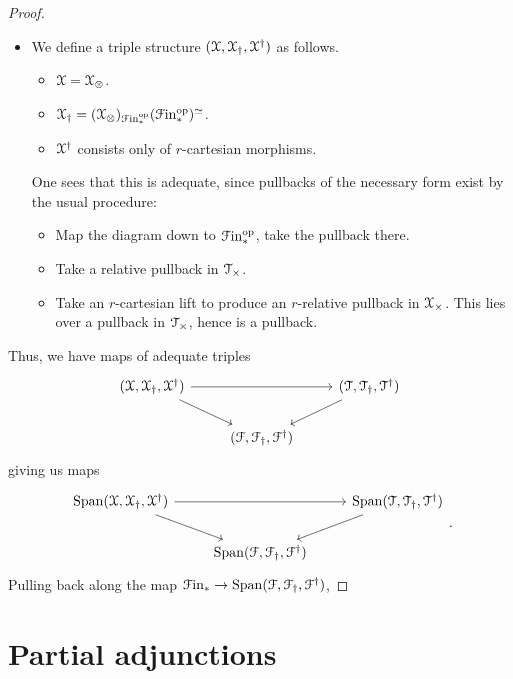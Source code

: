 \documentclass[main.tex]{subfiles}
\begin{document}
\begin{proof}
\begin{itemize}
    \item We define a triple structure $(\mathcal{X}, \mathcal{X}_{\dagger}, \mathcal{X}^{\dagger})$ as follows.
      \begin{itemize}
        \item $\mathcal{X} = \mathcal{X}_{\otimes}$.

        \item $\mathcal{X}_{\dagger} = (\mathcal{X}_{\otimes})_{\mathcal{F}\mathrm{in}_{*}^{\mathrm{op}}}(\mathcal{F}\mathrm{in}_{*}^{\mathrm{op}})^{\simeq}$.

        \item $\mathcal{X}^{\dagger}$ consists only of $r$-cartesian morphisms.
      \end{itemize}

      One sees that this is adequate, since pullbacks of the necessary form exist by the usual procedure:
      \begin{itemize}
        \item Map the diagram down to $\mathcal{F}\mathrm{in}_{*}^{\mathrm{op}}$, take the pullback there.

        \item Take a relative pullback in $\mathcal{T}_{\times}$.

        \item Take an $r$-cartesian lift to produce an $r$-relative pullback in $\mathcal{X}_{\times}$. This lies over a pullback in $\mathcal{T}_{\times}$, hence is a pullback.
      \end{itemize}
  \end{itemize}

  Thus, we have maps of adequate triples
  \begin{equation*}
    \begin{tikzcd}
      \triple{X}
      \arrow[rr]
      \arrow[dr]
      && \triple{T}
      \arrow[dl]
      \\
      & \triple{F}
    \end{tikzcd}
  \end{equation*}
  giving us maps
  \begin{equation*}
    \begin{tikzcd}
      \Span\triple{X}
      \arrow[rr]
      \arrow[dr]
      && \Span\triple{T}
      \arrow[dl]
      \\
      & \Span\triple{F}
    \end{tikzcd}.
  \end{equation*}
  Pulling back along the map $\mathcal{F}\mathrm{in}_{*} \to \mathrm{Span}(\mathcal{F}, \mathcal{F}_{\dagger}, \mathcal{F}^{\dagger})$,
\end{proof}

\section{Partial adjunctions}
\label{sec:partial_adjunctions}
\end{document}
